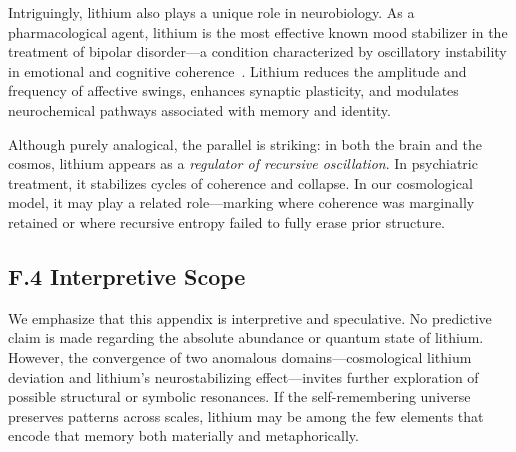 Intriguingly, lithium also plays a unique role in neurobiology. As a pharmacological agent, lithium is the most effective known mood stabilizer in the treatment of bipolar disorder—a condition characterized by oscillatory instability in emotional and cognitive coherence~\cite{malhi2017lithium}. Lithium reduces the amplitude and frequency of affective swings, enhances synaptic plasticity, and modulates neurochemical pathways associated with memory and identity.

Although purely analogical, the parallel is striking: in both the brain and the cosmos, lithium appears as a \textit{regulator of recursive oscillation}. In psychiatric treatment, it stabilizes cycles of coherence and collapse. In our cosmological model, it may play a related role—marking where coherence was marginally retained or where recursive entropy failed to fully erase prior structure.

\subsection*{F.4 Interpretive Scope}

We emphasize that this appendix is interpretive and speculative. No predictive claim is made regarding the absolute abundance or quantum state of lithium. However, the convergence of two anomalous domains—cosmological lithium deviation and lithium's neurostabilizing effect—invites further exploration of possible structural or symbolic resonances. If the self-remembering universe preserves patterns across scales, lithium may be among the few elements that encode that memory both materially and metaphorically.


